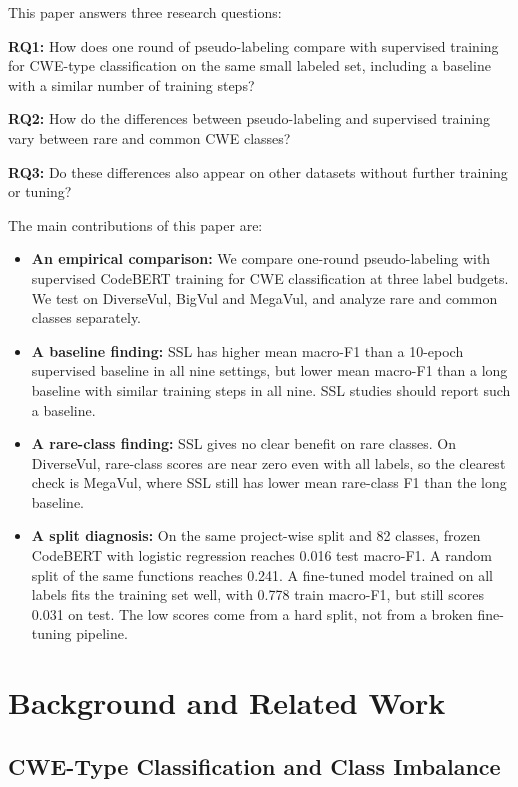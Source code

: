 \documentclass[conference]{IEEEtran}
\providecommand{\tightlist}{%
  \setlength{\itemsep}{0pt}\setlength{\parskip}{0pt}}
\begin{document}
This paper answers three research questions:

\textbf{RQ1:} How does one round of pseudo-labeling compare with
supervised training for CWE-type classification on the same small
labeled set, including a baseline with a similar number of training
steps?

\textbf{RQ2:} How do the differences between pseudo-labeling and
supervised training vary between rare and common CWE classes?

\textbf{RQ3:} Do these differences also appear on other datasets without
further training or tuning?

The main contributions of this paper are:

\begin{itemize}
\tightlist
\item
  \textbf{An empirical comparison:} We compare one-round pseudo-labeling
  with supervised CodeBERT training for CWE classification at three
  label budgets. We test on DiverseVul, BigVul and MegaVul, and analyze
  rare and common classes separately.
\item
  \textbf{A baseline finding:} SSL has higher mean macro-F1 than a
  10-epoch supervised baseline in all nine settings, but lower mean
  macro-F1 than a long baseline with similar training steps in all nine.
  SSL studies should report such a baseline.
\item
  \textbf{A rare-class finding:} SSL gives no clear benefit on rare
  classes. On DiverseVul, rare-class scores are near zero even with all
  labels, so the clearest check is MegaVul, where SSL still has lower
  mean rare-class F1 than the long baseline.
\item
  \textbf{A split diagnosis:}
  On the same project-wise split and 82 classes, frozen CodeBERT with logistic regression reaches 0.016 test macro-F1. A random split of the same functions reaches 0.241. A fine-tuned model trained on all labels fits the training set well, with 0.778 train macro-F1, but still scores 0.031 on test. The low scores come from a hard split, not from a broken fine-tuning pipeline.
\end{itemize}

\section{Background and Related Work}\label{related-work}

\subsection{CWE-Type Classification and Class
Imbalance}\label{cwe-type-classification-and-class-imbalance}
\end{document}
